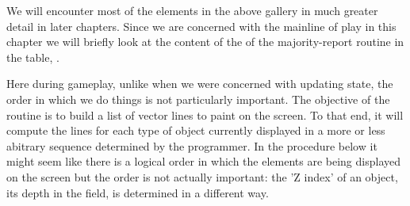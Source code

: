 We will encounter most of the elements in the above gallery in much greater detail in later chapters. Since we are concerned with the mainline
of play in this chapter we will briefly look at the content of the of the majority-report routine in the table, .

Here during gameplay, unlike when we were concerned with updating
state, the order in which we do things is not particularly important. The objective of the  routine is to build a list of vector
lines to paint on the screen. To that end, it will compute the lines for each type of object currently displayed in a more or less abitrary sequence
determined by the programmer. In the procedure below it might seem like there is a logical order in which the elements are being displayed
on the screen but the order is not actually important: the 'Z index' of an object, its depth in the field, is determined in a different way. 

